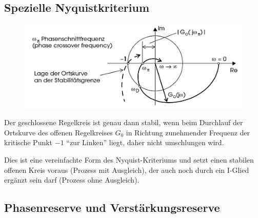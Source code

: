 \subsection{Spezielle Nyquistkriterium }
\begin{figure}[h!]
	\centering
	\includegraphics[width = .9\linewidth]{./images/Nyquistkurve}

\end{figure}
Der geschlossene Regelkreis ist genau dann stabil, wenn beim Durchlauf der Ortskurve des offenen Regelkreises \(G_0\) in Richtung zunehmender Frequenz der kritische Punkt \(-1\) ``zur Linken'' liegt, daher nicht umschlungen wird.

Dies ist eine vereinfachte Form des Nyquist-Kriteriums und setzt einen stabilen offenen Kreis voraus (Prozess mit Ausgleich), der auch noch durch ein I-Glied ergänzt sein darf (Prozess ohne Ausgleich).

\subsection{Phasenreserve und Verstärkungsreserve }

